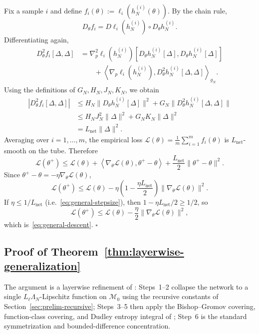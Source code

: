 \documentclass[letterpaper]{article}
\begin{document}
Fix a sample \(i\) and define \(f_i(\theta) := \ell_i(h_N^{(i)}(\theta))\).
By the chain rule,
\[
D_\theta f_i
=
D\ell_i(h_N^{(i)})
\circ
D_\theta h_N^{(i)}.
\]
Differentiating again,
\[
\begin{aligned}
D_\theta^2 f_i[\Delta,\Delta]
&=
\nabla_p^2\ell_i(h_N^{(i)})
\left[
D_\theta h_N^{(i)}[\Delta],
D_\theta h_N^{(i)}[\Delta]
\right]
\\
&\qquad
+
\left\langle
\nabla_p\ell_i(h_N^{(i)}),
D_\theta^2 h_N^{(i)}[\Delta,\Delta]
\right\rangle_{g_N}.
\end{aligned}
\]
Using the definitions of \(G_N,H_N,J_N,K_N\), we obtain
\[
\begin{aligned}
|D_\theta^2 f_i[\Delta,\Delta]|
&\le
H_N \|D_\theta h_N^{(i)}[\Delta]\|^2
+
G_N \|D_\theta^2 h_N^{(i)}[\Delta,\Delta]\|
\\
&\le
H_NJ_N^2\|\Delta\|^2 + G_NK_N\|\Delta\|^2
\\
&=
L_{\mathrm{net}}\|\Delta\|^2.
\end{aligned}
\]
Averaging over \(i=1,\dots,m\), the empirical loss
\(\mathcal L(\theta) = \frac1m\sum_{i=1}^m f_i(\theta)\) is
\(L_{\mathrm{net}}\)-smooth on the tube. Therefore
\[
\mathcal L(\theta^+)
\le
\mathcal L(\theta)
+
\left\langle
\nabla_\theta\mathcal L(\theta), \theta^+-\theta
\right\rangle
+
\frac{L_{\mathrm{net}}}{2}
\|\theta^+-\theta\|^2.
\]
Since \(\theta^+-\theta = -\eta\nabla_\theta\mathcal L(\theta)\),
\[
\mathcal L(\theta^+)
\le
\mathcal L(\theta)
-
\eta \left(1-\frac{\eta L_{\mathrm{net}}}{2}\right)
\|\nabla_\theta\mathcal L(\theta)\|^2.
\]
If \(\eta\le 1/L_{\mathrm{net}}\) (i.e.~\eqref{eq:general-stepsize}), then
\(1-\eta L_{\mathrm{net}}/2 \ge 1/2\), so
\[
\mathcal L(\theta^+)
\le
\mathcal L(\theta) - \frac{\eta}{2} \|\nabla_\theta\mathcal L(\theta)\|^2,
\]
which is~\eqref{eq:general-descent}. $\square$

\subsection{Proof of Theorem~\ref{thm:layerwise-generalization}}
\label{sec:proof-layerwise-gen}

The argument is a layerwise refinement of \cite{sarkar2025learning}:
Steps~1--2 collapse the network to a single $L_\ell \Lambda_N$-Lipschitz
function on $\mathcal M_0$ using the recursive constants of
Section~\ref{sec:prelim-recursive}; Steps~3--5 then apply the
Bishop--Gromov covering, function-class covering, and Dudley entropy
integral of \cite[Theorems~3.1--3.3]{sarkar2025learning}; Step~6 is the
standard symmetrization and bounded-difference concentration.
\end{document}
